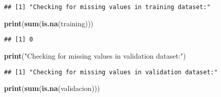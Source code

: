 \documentclass[
]{article}
\newenvironment{Shaded}{\begin{snugshade}}{\end{snugshade}}
\newcommand{\CommentTok}[1]{\textcolor[rgb]{0.56,0.35,0.01}{\textit{#1}}}
\newcommand{\ControlFlowTok}[1]{\textcolor[rgb]{0.13,0.29,0.53}{\textbf{#1}}}
\newcommand{\FunctionTok}[1]{\textcolor[rgb]{0.13,0.29,0.53}{\textbf{#1}}}
\newcommand{\NormalTok}[1]{#1}
\newcommand{\OtherTok}[1]{\textcolor[rgb]{0.56,0.35,0.01}{#1}}
\newcommand{\SpecialCharTok}[1]{\textcolor[rgb]{0.81,0.36,0.00}{\textbf{#1}}}
\newcommand{\StringTok}[1]{\textcolor[rgb]{0.31,0.60,0.02}{#1}}
\begin{document}
\begin{Shaded}
\end{Shaded}

\begin{verbatim}
## [1] "Checking for missing values in training dataset:"
\end{verbatim}

\begin{Shaded}
\begin{Highlighting}[]
\FunctionTok{print}\NormalTok{(}\FunctionTok{sum}\NormalTok{(}\FunctionTok{is.na}\NormalTok{(training)))}
\end{Highlighting}
\end{Shaded}

\begin{verbatim}
## [1] 0
\end{verbatim}

\begin{Shaded}
\begin{Highlighting}[]
\FunctionTok{print}\NormalTok{(}\StringTok{"Checking for missing values in validation dataset:"}\NormalTok{)}
\end{Highlighting}
\end{Shaded}

\begin{verbatim}
## [1] "Checking for missing values in validation dataset:"
\end{verbatim}

\begin{Shaded}
\begin{Highlighting}[]
\FunctionTok{print}\NormalTok{(}\FunctionTok{sum}\NormalTok{(}\FunctionTok{is.na}\NormalTok{(validacion)))}
\end{Highlighting}
\end{Shaded}
\end{document}
